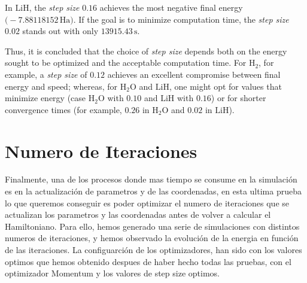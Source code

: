In \(\mathrm{LiH}\), the \textit{step size} \(0.16\) achieves the most negative final energy \(\bigl(-7.88118152\,\mathrm{Ha}\bigr)\). If the goal is to minimize computation time, the \textit{step size} \(0.02\) stands out with only \(13915.43\,\mathrm{s}\).

Thus, it is concluded that the choice of \textit{step size} depends both on the energy sought to be optimized and the acceptable computation time. For \(\mathrm{H_2}\), for example, a \textit{step size} of \(0.12\) achieves an excellent compromise between final energy and speed; whereas, for \(\mathrm{H_2O}\) and \(\mathrm{LiH}\), one might opt for values that minimize energy (case \(\mathrm{H_2O}\) with \(0.10\) and \(\mathrm{LiH}\) with \(0.16\)) or for shorter convergence times (for example, \(0.26\) in \(\mathrm{H_2O}\) and \(0.02\) in \(\mathrm{LiH}\)).

\section{Numero de Iteraciones}

Finalmente, una de los procesos donde mas tiempo se consume en la simulación es en la actualización de parametros y de las coordenadas, en esta ultima prueba lo que queremos conseguir es poder optimizar el numero de iteraciones que se actualizan los parametros y las coordenadas antes de volver a calcular el Hamiltoniano. Para ello, hemos generado una serie de simulaciones con distintos numeros de iteraciones, y hemos observado la evolución de la energia en función de las iteraciones. La configuarción de los optimizadores, han sido con los valores optimos que hemos obtenido despues de haber hecho todas las pruebas, con el optimizador Momentum y los valores de step size optimos.

